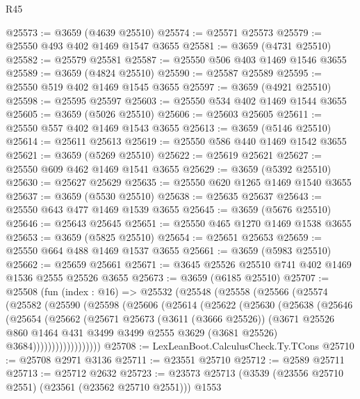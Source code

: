 \begin{lexlean}{R45}
\begin{coremodule}
@25573 := @3659 (@4639 @25510)
@25574 := @25571 @25573
@25579 := @25550 @493 @402 @1469 @1547 @3655
@25581 := @3659 (@4731 @25510)
@25582 := @25579 @25581
@25587 := @25550 @506 @403 @1469 @1546 @3655
@25589 := @3659 (@4824 @25510)
@25590 := @25587 @25589
@25595 := @25550 @519 @402 @1469 @1545 @3655
@25597 := @3659 (@4921 @25510)
@25598 := @25595 @25597
@25603 := @25550 @534 @402 @1469 @1544 @3655
@25605 := @3659 (@5026 @25510)
@25606 := @25603 @25605
@25611 := @25550 @557 @402 @1469 @1543 @3655
@25613 := @3659 (@5146 @25510)
@25614 := @25611 @25613
@25619 := @25550 @586 @440 @1469 @1542 @3655
@25621 := @3659 (@5269 @25510)
@25622 := @25619 @25621
@25627 := @25550 @609 @462 @1469 @1541 @3655
@25629 := @3659 (@5392 @25510)
@25630 := @25627 @25629
@25635 := @25550 @620 @1265 @1469 @1540 @3655
@25637 := @3659 (@5530 @25510)
@25638 := @25635 @25637
@25643 := @25550 @643 @477 @1469 @1539 @3655
@25645 := @3659 (@5676 @25510)
@25646 := @25643 @25645
@25651 := @25550 @465 @1270 @1469 @1538 @3655
@25653 := @3659 (@5825 @25510)
@25654 := @25651 @25653
@25659 := @25550 @664 @488 @1469 @1537 @3655
@25661 := @3659 (@5983 @25510)
@25662 := @25659 @25661
@25671 := @3645 @25526 @25510 @741 @402 @1469 @1536 @2555 @25526 @3655
@25673 := @3659 (@6185 @25510)
@25707 := @25508
    (fun (index : @16) =>
    @25532
      (@25548
        (@25558
          (@25566
            (@25574
              (@25582
                (@25590
                  (@25598
                    (@25606
                      (@25614
                        (@25622
                          (@25630
                            (@25638
                              (@25646
                                (@25654
                                  (@25662
                                    (@25671
                                      @25673
                                      (@3611 (@3666 @25526))
                                      (@3671
                                        @25526
                                        @860
                                        @1464
                                        @431
                                        @3499
                                        @3499
                                        @2555
                                        @3629
                                        (@3681 @25526)
                                        @3684))))))))))))))))))
@25708 := LexLeanBoot.CalculusCheck.Ty.TCons
@25710 := @25708 @2971 @3136
@25711 := @23551 @25710
@25712 := @2589 @25711
@25713 := @25712 @2632
@25723 := @23573 @25713 (@3539 (@23556 @25710 @2551) (@23561 (@23562 @25710 @2551))) @1553

\end{coremodule}
\end{lexlean}
